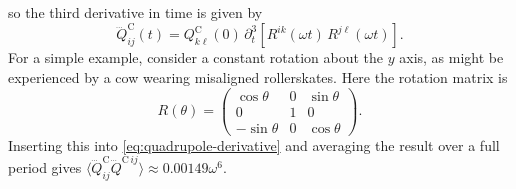 \documentclass[
    prd, twocolumn, nofootinbib, amsmath, amssymb,
    aps, floatfix, preprintnumbers
]{revtex4-2}
\begin{document}
so the third derivative in time is given by
\begin{equation}
    \label{eq:quadrupole-derivative}
    \dddot{Q}_{ij}^{\mathrm{C}}(t) = 
        Q_{k\ell}^{\mathrm{C}}(0)\,
        \partial_t^3\left[R^{ik}(\omega t)\,R^{j\ell}(\omega t)\right]
    .
\end{equation}
For a simple example, consider a constant rotation about the $y$ axis, as might be experienced by a cow wearing misaligned rollerskates. Here the rotation matrix is
\begin{equation}
    R(\theta) =
    \begin{pmatrix}
        \cos\theta & 0 & \sin\theta \\
        0 & 1 & 0 \\
        -\sin\theta & 0 & \cos\theta
    \end{pmatrix}
    .
\end{equation}
Inserting this into \cref{eq:quadrupole-derivative} and averaging the result over a full period gives $\langle\dddot{Q}^{\mathrm{C}}_{ij}\dddot{Q}^{\mathrm{C}\,ij}\rangle \approx 0.00149 \omega^6$.
\end{document}
